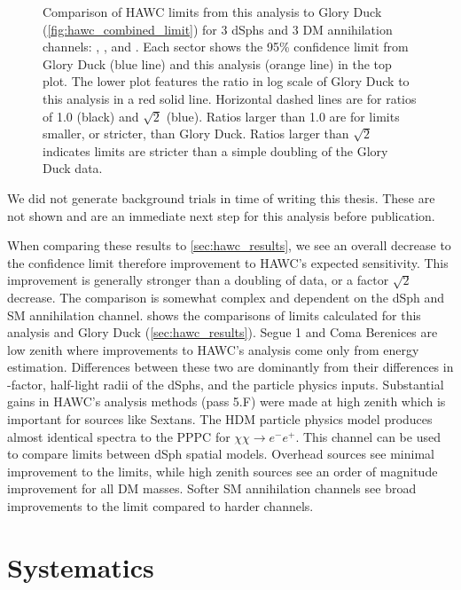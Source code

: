 \begin{figure}[h]
{\begin{tabular}{cccc}
    \end{tabular}
    }
    \caption{Comparison of HAWC limits from this analysis to Glory Duck (\cref{fig:hawc_combined_limit}) for 3 dSphs and 3 DM annihilation channels: , \parpar{\tau}, and . Each sector shows the 95\% confidence limit from Glory Duck (blue line) and this analysis (orange line) in the top plot. The lower plot features the ratio in log scale of Glory Duck to this analysis in a red solid line. Horizontal dashed lines are for ratios of 1.0 (black) and $\sqrt{2}$ (blue). Ratios larger than 1.0 are for limits smaller, or stricter, than Glory Duck. Ratios larger than $\sqrt{2}$ indicates limits are stricter than a simple doubling of the Glory Duck data.}
\label{fig:mtd_compare2gd}
\end{figure}

We did not generate background trials in time of writing this thesis.
These are not shown and are an immediate next step for this analysis before publication.

When comparing these results to \cref{sec:hawc_results}, we see an overall decrease to the confidence limit therefore improvement to HAWC's expected sensitivity.
This improvement is generally stronger than a doubling of data, or a factor $\sqrt{2}$ decrease.
The comparison is somewhat complex and dependent on the dSph and SM annihilation channel.
 shows the comparisons of limits calculated for this analysis and Glory Duck (\cref{sec:hawc_results}).
Segue 1 and Coma Berenices are low zenith where improvements to HAWC's analysis come only from energy estimation.
Differences between these two are dominantly from their differences in \J-factor, half-light radii of the dSphs, and the particle physics inputs.
Substantial gains in HAWC's analysis methods (pass 5.F) were made at high zenith which is important for sources like Sextans.
The HDM particle physics model produces almost identical spectra to the PPPC for $\chi\chi \rightarrow e^-e^+$.
This channel can be used to compare limits between dSph spatial models.
Overhead sources see minimal improvement to the limits, while high zenith sources see an order of magnitude improvement for all DM masses.
Softer SM annihilation channels see broad improvements to the limit compared to harder channels.


\section{Systematics}\label{sec:mtd_systemaics}

